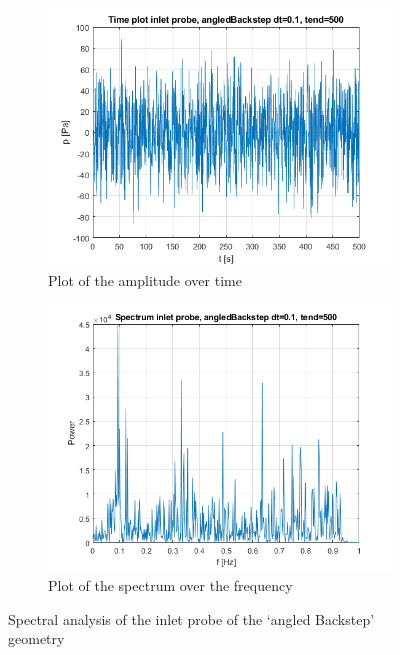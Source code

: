 \documentclass[fleqn,12pt]{NTFD} %
\begin{document}
\begin{figure}[H]
\centering
\begin{subfigure}{.5\textwidth}
  \centering
  \includegraphics[width=.8\linewidth]{angledbackstep_time_inlet.png}
  \caption{Plot of the amplitude over time}
  \label{fig:sub1}
\end{subfigure}%
\begin{subfigure}{.5\textwidth}
  \centering
  \includegraphics[width=.8\linewidth]{angledbackstep_spectrum_inlet.png}
  \caption{Plot of the spectrum over the frequency}
  \label{fig:sub2}
\end{subfigure}
\caption{Spectral analysis of the inlet probe of the `angled Backstep' geometry}
\label{fig:test}
\end{figure}
\end{document}
